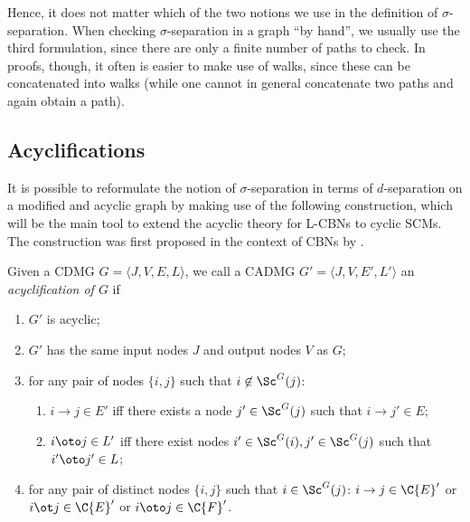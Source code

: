 Hence, it does not matter which of the two notions we use in the definition of $\sigma$-separation.
When checking $\sigma$-separation in a graph ``by hand'', we usually use the third formulation, since there are only a finite
number of paths to check. In proofs, though, it often is easier to make use of walks, since these can be concatenated into walks
(while one cannot in general concatenate two paths and again obtain a path).


\subsection{Acyclifications}

It is possible to reformulate the notion of $\sigma$-separation in terms of $d$-separation on a modified and acyclic graph
by making use of the following construction, which will be the main tool to extend the acyclic theory for
L-CBNs to cyclic SCMs. The construction was first proposed in the context of CBNs by \cite{Spirtes94,Spirtes95}.
\begin{Def}\label{def:cdg_acyclification}
  Given a CDMG $G = \langle J, V, E, L \rangle$, we call a CADMG $G' = \langle J, V, E', L' \rangle$
  an \emph{acyclification of $G$} if
  \begin{enumerate}[label=(\roman*)]
    \item $G'$ is acyclic;
    \item $G'$ has the same input nodes $J$ and output nodes $V$ as $G$;
    \item for any pair of nodes $\{i,j\}$ such that $i \not\in\Sc^G(j)$:
      \begin{enumerate}
      \item $i \to j \in E'$ iff there exists a node $j' \in \Sc^G(j)$ such that $i \to j' \in E$;
      \item $i \oto j \in L'$ iff there exist nodes $i' \in \Sc^G(i), j' \in \Sc^G(j)$ such that $i' \oto j' \in L$;
      \end{enumerate}\label{def:acyclification_inter_scc}
    \item for any pair of distinct nodes $\{i,j\}$ such that $i \in\Sc^G(j)$: $i \to j \in \C{E}'$ or $i \ot j \in \C{E}'$ or $i \oto j \in \C{F}'$.\label{def:acyclification_intra_scc}
  \end{enumerate}
\end{Def}

